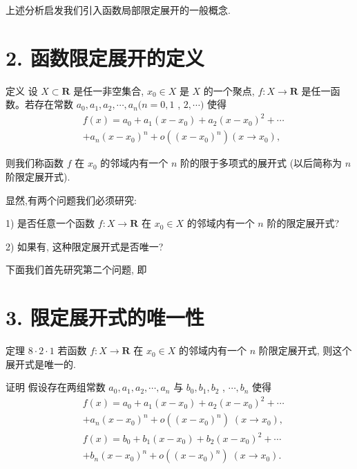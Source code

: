 上述分析启发我们引入函数局部限定展开的一般概念.

\section*{2. 函数限定展开的定义}

定义 设 $X \subset  \mathbf{R}$ 是任一非空集合, ${x}_{0} \in  X$ 是 $X$ 的一个聚点, $f : X \rightarrow  \mathbf{R}$ 是任一函数。若存在常数 ${a}_{0},{a}_{1},{a}_{2},\cdots ,{a}_{n}(n = 0,1$ , $2,\cdots )$ 使得
\begin{align*}
	&f\left( x\right)  = {a}_{0} + {a}_{1}\left( {x - {x}_{0}}\right)  + {a}_{2}{\left( x - {x}_{0}\right) }^{2} + \cdots\\
	&+ {a}_{n}{\left( x - {x}_{0}\right) }^{n} + o\left( {\left( x - {x}_{0}\right) }^{n}\right) \left( {x \rightarrow  {x}_{0}}\right) ,
\end{align*}

则我们称函数 $f$ 在 ${x}_{0}$ 的邻域内有一个 $n$ 阶的限于多项式的展开式 (以后简称为 $n$ 阶限定展开式).

显然,有两个问题我们必须研究:

1) 是否任意一个函数 $f : X \rightarrow  \mathbf{R}$ 在 ${x}_{0} \in  X$ 的邻域内有一个 $n$ 阶的限定展开式?

2) 如果有, 这种限定展开式是否唯一?

下面我们首先研究第二个问题, 即

\section*{3. 限定展开式的唯一性}

定理 $8 \cdot  2 \cdot  1$ 若函数 $f : X \rightarrow  \mathbf{R}$ 在 ${x}_{0} \in  X$ 的邻域内有一个 $n$ 阶限定展开式, 则这个展开式是唯一的.

证明 假设存在两组常数 ${a}_{0},{a}_{1},{a}_{2},\cdots ,{a}_{n}$ 与 ${b}_{0},{b}_{1},{b}_{2}$ , $\cdots ,{b}_{n}$ 使得
\begin{align*}
	&f\left( x\right)  = {a}_{0} + {a}_{1}\left( {x - {x}_{0}}\right)  + {a}_{2}{\left( x - {x}_{0}\right) }^{2} + \cdots\\
	&+ {a}_{n}{\left( x - {x}_{0}\right) }^{n} + o\left( {\left( x - {x}_{0}\right) }^{n}\right) \;\left( {x \rightarrow  {x}_{0}}\right) ,\\
	&f\left( x\right)  = {b}_{0} + {b}_{1}\left( {x - {x}_{0}}\right)  + {b}_{2}{\left( x - {x}_{0}\right) }^{2} + \cdots\\
	&+ {b}_{n}{\left( x - {x}_{0}\right) }^{n} + o\left( {\left( x - {x}_{0}\right) }^{n}\right) \;\left( {x \rightarrow  {x}_{0}}\right) .
\end{align*}

